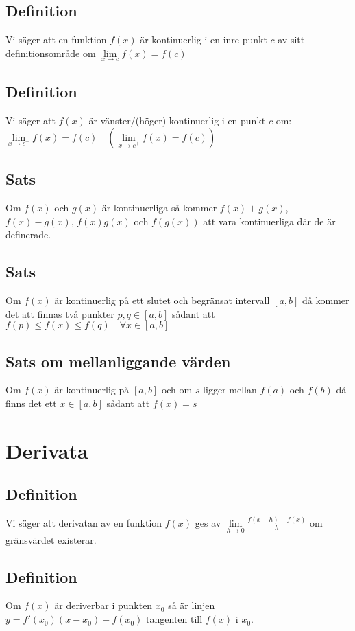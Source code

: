 \documentclass{article}
\begin{document}
\subsection{Definition}
Vi säger att en funktion $f(x)$ är kontinuerlig i en inre punkt $c$ av sitt definitionsområde om $\lim\limits_{x\to c}f(x)=f(c)$

\subsection{Definition}
Vi säger att $f(x)$ är vänster/(höger)-kontinuerlig i en punkt $c$ om: $\lim\limits_{x\to c^{-}} f(x)=f(c) \quad (\lim\limits_{x\to c^{+}} f(x)=f(c))$

\subsection{Sats}
Om $f(x)$ och $g(x)$ är kontinuerliga så kommer $f(x)+g(x)$, $f(x)-g(x)$, $f(x)g(x)$ och $f(g(x))$ att vara kontinuerliga där de är definerade.

\subsection{Sats}
Om $f(x)$ är kontinuerlig på ett slutet och begränsat intervall  $[a,b]$ då kommer det att finnas två punkter $p,q\in [a,b]$ sådant att $f(p)\leq f(x)\leq f(q) \quad \forall x\in [a,b]$

\subsection{Sats om mellanliggande värden}
Om $f(x)$ är kontinuerlig på $[a,b]$ och om $s$ ligger mellan $f(a)$ och $f(b)$ då finns det ett $x\in [a,b]$ sådant att $f(x)=s$

\section{Derivata}
\subsection{Definition}
Vi säger att derivatan av en funktion $f(x)$ ges av $\lim\limits_{h\to  0}\frac{f(x+h)-f(x)}{h}$ om gränsvärdet existerar.

\subsection{Definition}
Om $f(x)$ är deriverbar i punkten $x_{0}$ så är linjen $y=f'(x_{0})(x-x_{0})+f(x_{0})$ tangenten till $f(x)$ i $x_{0}$.
\end{document}
